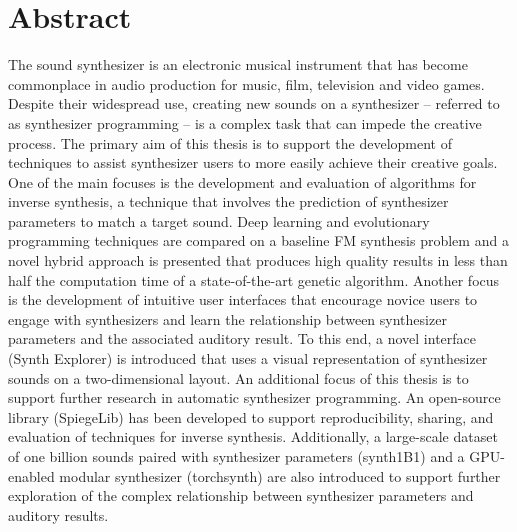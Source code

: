 \newpage
{}

\chapter*{Abstract}
The sound synthesizer is an electronic musical instrument that has become commonplace in audio production for music, film, television and video games. Despite their widespread use, creating new sounds on a synthesizer -- referred to as synthesizer programming -- is a complex task that can impede the creative process. The primary aim of this thesis is to support the development of techniques to assist synthesizer users to more easily achieve their creative goals. One of the main focuses is the development and evaluation of algorithms for inverse synthesis, a technique that involves the prediction of synthesizer parameters to match a target sound. Deep learning and evolutionary programming techniques are compared on a baseline FM synthesis problem and a novel hybrid approach is presented that produces high quality results in less than half the computation time of a state-of-the-art genetic algorithm. Another focus is the development of intuitive user interfaces that encourage novice users to engage with synthesizers and learn the relationship between synthesizer parameters and the associated auditory result. To this end, a novel interface (Synth Explorer) is introduced that uses a visual representation of synthesizer sounds on a two-dimensional layout. An additional focus of this thesis is to support further research in automatic synthesizer programming. An open-source library (SpiegeLib) has been developed to support reproducibility, sharing, and evaluation of techniques for inverse synthesis. Additionally, a large-scale dataset of one billion sounds paired with synthesizer parameters (synth1B1) and a GPU-enabled modular synthesizer (torchsynth) are also introduced to support further exploration of the complex relationship between synthesizer parameters and auditory results.






